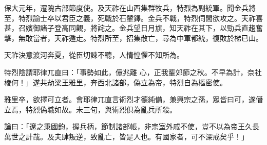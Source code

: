 \begin{pinyinscope}
 保大元年，遷隗古部節度使。及天祚在山西集群牧兵，特烈為副統軍。聞金兵將至，特烈諭士卒以君臣之義，死戰於石輦鐸。金兵不戰，特烈伺間欲攻之。天祚喜甚，召嬪御諸子登高同觀，將詫之。金兵望日月旗，知天祚在其下，以勁兵直趨奮擊，無敢當者，天祚遁走。特烈所至，招集散亡，尋為中軍都統，復敗於梯已山。



 天祚決意渡河奔夏，從臣切諫不聽，人情惶懼不知所為。



 特烈陰謂耶律兀直曰：「事勢如此，億兆離
 心，正我輩郊節之秋。不早為計，奈社棱何！」遂共劫梁王雅里，奔西北諸部，偽立為帝，特烈自為樞密使。



 雅里卒，欲擇可立者。會耶律兀直言術烈才德純備，兼興宗之孫，眾皆曰可，遂僭立焉，特烈偽職如故。未三旬，與術烈俱為亂兵所殺。



 論曰：「遼之秉國鈞，握兵柄，節制諸部帳，非宗室外戚不使，豈不以為帝王久長萬世之計哉。及夫肆叛逆，致亂亡，皆是人也。有國家者，可不深戒矣乎！」



\end{pinyinscope}